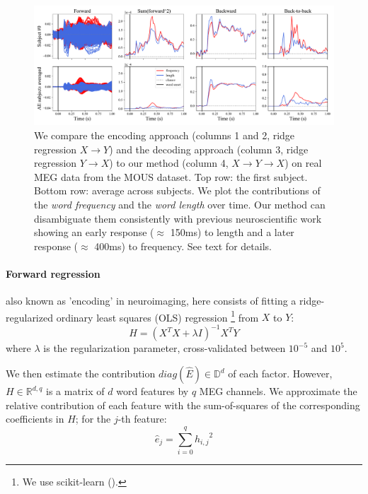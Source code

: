 \begin{figure}[t!]
  \centering
  \includegraphics[width=\textwidth, trim=0cm 0cm 0cm 0cm, clip=True]{figures/meg_twocurves.pdf}
  \caption{We compare the encoding approach (columns 1 and 2, ridge regression $X \rightarrow Y$) and the decoding approach (column 3, ridge regression $Y \rightarrow X$) to our method (column 4, $X \rightarrow Y \rightarrow X$) on real MEG data from the MOUS dataset. Top row: the first subject. Bottom row: average across subjects.
  We plot the contributions of the \textit{word frequency} and the \textit{word
  length} over time. Our method can disambiguate them consistently with
  previous neuroscientific work showing an early response ($\approx$ 150ms) to
  length and a later response ($\approx$ 400ms) to frequency. See text for
  details.}
  \label{fig:meg_twocurves}
\end{figure}


\paragraph{Forward regression} also known as 'encoding' in neuroimaging, here consists of
fitting a ridge-regularized ordinary least squares (OLS) regression \footnote{We use scikit-learn (\cite{sklearn}).} from $X$ to $Y$:
\begin{equation}
  H = (X^{T}X+\lambda I)^{-1} X^{T}Y
\end{equation}
where $\lambda$ is the
regularization parameter, cross-validated between $10^{-5}$ and $10^5$.

We then estimate the contribution
$diag(\hat E) \in\mathbb{D}^{d} $ of each factor. However, $H\in\mathbb{R}^{d,
q}$ is a matrix of $d$ word features by $q$ MEG channels. We approximate
the relative contribution of each feature with the sum-of-squares of the corresponding coefficients in $H$; for the $j$-th feature:
\begin{equation}
  \hat e_j = \sum_{i=0}^{q} {h_{i,j}}^2
\end{equation}
